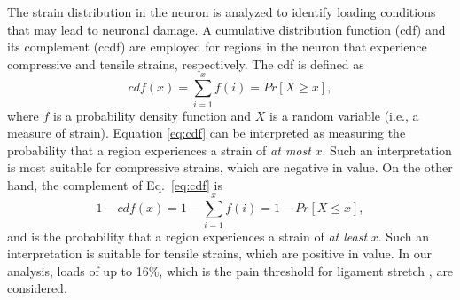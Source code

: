 \documentclass[10pt]{asme2ej}
\begin{document}
%
The strain distribution in the neuron is analyzed to identify loading conditions that may lead to neuronal damage. A cumulative distribution function (cdf) and its complement (ccdf) are employed for regions in the neuron that experience compressive and tensile strains, respectively. The cdf is defined as
%
\begin{equation}
cdf(x) = \sum_{i=1}^x f(i) = Pr[X \ge x],
\label{eq:cdf}
\end{equation}
%
where $f$ is a probability density function and $X$ is a random variable (i.e., a measure of strain). Equation \ref{eq:cdf} can be interpreted as measuring the probability that a region experiences a strain of \textit{at most} $x$. Such an interpretation is most suitable for compressive strains, which are negative in value. On the other hand, the complement of Eq.\ \eqref{eq:cdf} is
%
\begin{equation}
1 - cdf(x) = 1 - \sum_{i=1}^x f(i) = 1 - Pr[X \le x],
\label{eq:ccdf}
\end{equation}
%
and is the probability that a region experiences a strain of \textit{at least} $x$. Such an interpretation is suitable for tensile strains, which are positive in value. In our analysis, loads of up to 16$\%$, which is the pain threshold for ligament stretch \cite{Zhang:2016ga}, are considered. 

\end{document}

